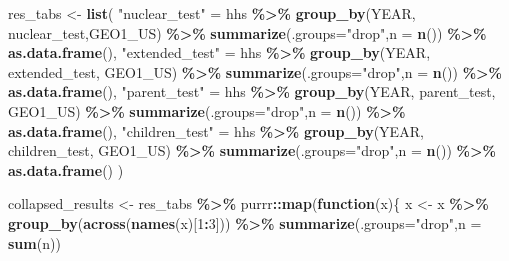 \documentclass[
]{book}
\newenvironment{Shaded}{\begin{snugshade}}{\end{snugshade}}
\newcommand{\AttributeTok}[1]{\textcolor[rgb]{0.13,0.29,0.53}{#1}}
\newcommand{\ControlFlowTok}[1]{\textcolor[rgb]{0.13,0.29,0.53}{\textbf{#1}}}
\newcommand{\DecValTok}[1]{\textcolor[rgb]{0.00,0.00,0.81}{#1}}
\newcommand{\FunctionTok}[1]{\textcolor[rgb]{0.13,0.29,0.53}{\textbf{#1}}}
\newcommand{\NormalTok}[1]{#1}
\newcommand{\OtherTok}[1]{\textcolor[rgb]{0.56,0.35,0.01}{#1}}
\newcommand{\SpecialCharTok}[1]{\textcolor[rgb]{0.81,0.36,0.00}{\textbf{#1}}}
\newcommand{\StringTok}[1]{\textcolor[rgb]{0.31,0.60,0.02}{#1}}
\begin{document}
\begin{Shaded}
\begin{Highlighting}[]
  
\NormalTok{  res\_tabs }\OtherTok{\textless{}{-}} \FunctionTok{list}\NormalTok{(}
    \StringTok{"nuclear\_test"} \OtherTok{=}\NormalTok{ hhs }\SpecialCharTok{\%\textgreater{}\%} \FunctionTok{group\_by}\NormalTok{(YEAR, nuclear\_test,GEO1\_US) }\SpecialCharTok{\%\textgreater{}\%} \FunctionTok{summarize}\NormalTok{(}\AttributeTok{.groups=}\StringTok{"drop"}\NormalTok{,}\AttributeTok{n =} \FunctionTok{n}\NormalTok{()) }\SpecialCharTok{\%\textgreater{}\%} \FunctionTok{as.data.frame}\NormalTok{(),}
  \StringTok{"extended\_test"} \OtherTok{=}\NormalTok{ hhs }\SpecialCharTok{\%\textgreater{}\%} \FunctionTok{group\_by}\NormalTok{(YEAR, extended\_test, GEO1\_US) }\SpecialCharTok{\%\textgreater{}\%} \FunctionTok{summarize}\NormalTok{(}\AttributeTok{.groups=}\StringTok{"drop"}\NormalTok{,}\AttributeTok{n =} \FunctionTok{n}\NormalTok{()) }\SpecialCharTok{\%\textgreater{}\%} \FunctionTok{as.data.frame}\NormalTok{(),}
  \StringTok{"parent\_test"} \OtherTok{=}\NormalTok{ hhs }\SpecialCharTok{\%\textgreater{}\%} \FunctionTok{group\_by}\NormalTok{(YEAR, parent\_test, GEO1\_US) }\SpecialCharTok{\%\textgreater{}\%} \FunctionTok{summarize}\NormalTok{(}\AttributeTok{.groups=}\StringTok{"drop"}\NormalTok{,}\AttributeTok{n =} \FunctionTok{n}\NormalTok{()) }\SpecialCharTok{\%\textgreater{}\%} \FunctionTok{as.data.frame}\NormalTok{(),}
  \StringTok{"children\_test"} \OtherTok{=}\NormalTok{ hhs }\SpecialCharTok{\%\textgreater{}\%} \FunctionTok{group\_by}\NormalTok{(YEAR, children\_test, GEO1\_US) }\SpecialCharTok{\%\textgreater{}\%} \FunctionTok{summarize}\NormalTok{(}\AttributeTok{.groups=}\StringTok{"drop"}\NormalTok{,}\AttributeTok{n =} \FunctionTok{n}\NormalTok{()) }\SpecialCharTok{\%\textgreater{}\%} \FunctionTok{as.data.frame}\NormalTok{()}
\NormalTok{  )}
  
  
  
  

\NormalTok{collapsed\_results }\OtherTok{\textless{}{-}}\NormalTok{ res\_tabs }\SpecialCharTok{\%\textgreater{}\%}\NormalTok{ purrr}\SpecialCharTok{::}\FunctionTok{map}\NormalTok{(}\ControlFlowTok{function}\NormalTok{(x)\{}
\NormalTok{  x }\OtherTok{\textless{}{-}}\NormalTok{ x }\SpecialCharTok{\%\textgreater{}\%} \FunctionTok{group\_by}\NormalTok{(}\FunctionTok{across}\NormalTok{(}\FunctionTok{names}\NormalTok{(x)[}\DecValTok{1}\SpecialCharTok{:}\DecValTok{3}\NormalTok{])) }\SpecialCharTok{\%\textgreater{}\%} \FunctionTok{summarize}\NormalTok{(}\AttributeTok{.groups=}\StringTok{"drop"}\NormalTok{,}\AttributeTok{n =} \FunctionTok{sum}\NormalTok{(n))}


\end{Highlighting}
\end{Shaded}
\end{document}
